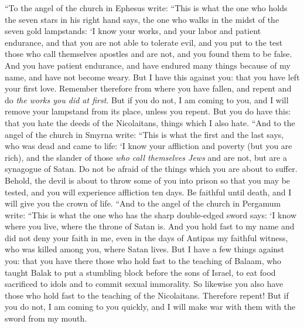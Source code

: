 \begin{biblechapter} %
 “To the angel of the church in Ephesus write:
\verse “This is what the one who holds the seven stars in his right hand says, the one who walks in the midst of the seven gold lampstands:
\verse ‘I know your works, and your labor and patient endurance, and that you are not able to tolerate evil, and you put to the test those who call themselves apostles and are not, and you found them to be false.
\verse And you have patient endurance, and have endured many things because of my name, and have not become weary.
\verse But I have this against you: that you have left your first love.
\verse Remember therefore from where you have fallen, and repent and do \textit{the works you did at first}. But if you do not, I am coming to you, and I will remove your lampstand from its place, unless you repent.
\verse But you do have this: that you hate the deeds of the Nicolaitans, things which I also hate.
 “And to the angel of the church in Smyrna write:
\verse “This is what the first and the last says, who was dead and came to life:
\verse ‘I know your affliction and poverty (but you are rich), and the slander of those \textit{who call themselves Jews} and are not, but are a synagogue of Satan.
\verse Do not be afraid of the things which you are about to suffer. Behold, the devil is about to throw some of you into prison so that you may be tested, and you will experience affliction ten days. Be faithful until death, and I will give you the crown of life.
 “And to the angel of the church in Pergamum write:
\verse “This is what the one who has the sharp double-edged sword says:
\verse ‘I know where you live, where the throne of Satan is. And you hold fast to my name and did not deny your faith in me, even in the days of Antipas my faithful witness, who was killed among you, where Satan lives.
\verse But I have a few things against you: that you have there those who hold fast to the teaching of Balaam, who taught Balak to put a stumbling block before the sons of Israel, to eat food sacrificed to idols and to commit sexual immorality.
\verse So likewise you also have those who hold fast to the teaching of the Nicolaitans.
\verse Therefore repent! But if you do not, I am coming to you quickly, and I will make war with them with the sword from my mouth.

\end{biblechapter}
